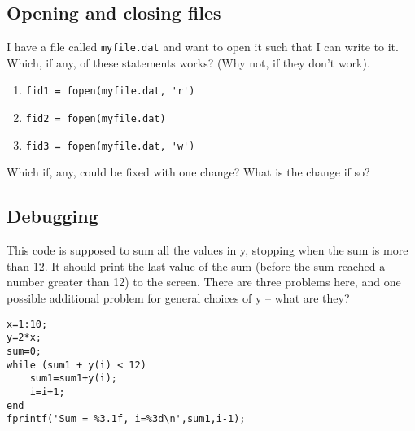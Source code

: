 \documentclass[letterpaper]{article}
\begin{document}
\vspace{2in}


\subsection {Opening and closing files}

I have a file called \verb+myfile.dat+ and want to open it such that I can write to it.  Which, if any, of these statements works? (Why not, if they don't work).

\begin{enumerate}
\item \verb+fid1 = fopen(myfile.dat, 'r')+
\item \verb+fid2 = fopen(myfile.dat)+
\item \verb+fid3 = fopen(myfile.dat, 'w')+
\end{enumerate}

Which if, any, could be fixed with one change?  What is the change if so?

\vspace{1in}

%
%
%



\newpage 
\subsection {Debugging}

This code is supposed to sum all the values in y, stopping when the sum is more than 12. It should print the last value of the sum (before the sum reached a number greater than 12) to the screen.  There are three problems here, and one possible additional problem for general choices of y -- what are they?

\begin{verbatim}
x=1:10;  
y=2*x;
sum=0;
while (sum1 + y(i) < 12)
    sum1=sum1+y(i);
    i=i+1;
end
fprintf('Sum = %3.1f, i=%3d\n',sum1,i-1);
\end{verbatim}
\end{document}
